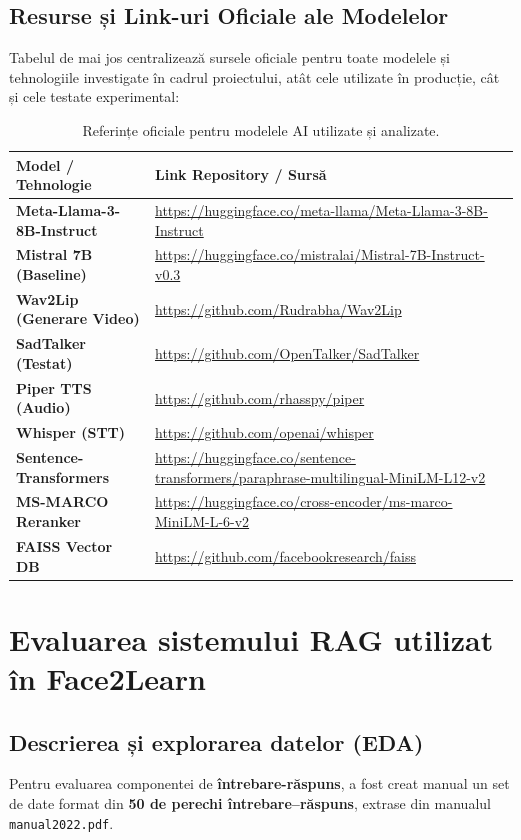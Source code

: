 \documentclass[12pt,a4paper]{report}
\begin{document}
\section{Resurse și Link-uri Oficiale ale Modelelor}
Tabelul de mai jos centralizează sursele oficiale pentru toate modelele și tehnologiile investigate în cadrul proiectului, atât cele utilizate în producție, cât și cele testate experimental:

\begin{table}[h!]
\centering
\begin{tabular}{|p{5cm}|p{9cm}|}
\hline
\textbf{Model / Tehnologie} & \textbf{Link Repository / Sursă} \\
\hline
\textbf{Meta-Llama-3-8B-Instruct} & \url{https://huggingface.co/meta-llama/Meta-Llama-3-8B-Instruct} \\
\hline
\textbf{Mistral 7B (Baseline)} & \url{https://huggingface.co/mistralai/Mistral-7B-Instruct-v0.3} \\
\hline
\textbf{Wav2Lip (Generare Video)} & \url{https://github.com/Rudrabha/Wav2Lip} \\
\hline
\textbf{SadTalker (Testat)} & \url{https://github.com/OpenTalker/SadTalker} \\
\hline
\textbf{Piper TTS (Audio)} & \url{https://github.com/rhasspy/piper} \\
\hline
\textbf{Whisper (STT)} & \url{https://github.com/openai/whisper} \\
\hline
\textbf{Sentence-Transformers} & \url{https://huggingface.co/sentence-transformers/paraphrase-multilingual-MiniLM-L12-v2} \\
\hline
\textbf{MS-MARCO Reranker} & \url{https://huggingface.co/cross-encoder/ms-marco-MiniLM-L-6-v2} \\
\hline
\textbf{FAISS Vector DB} & \url{https://github.com/facebookresearch/faiss} \\
\hline
\end{tabular}
\caption{Referințe oficiale pentru modelele AI utilizate și analizate.}
\end{table}

\chapter{Evaluarea sistemului RAG utilizat în Face2Learn}

\section{Descrierea și explorarea datelor (EDA)}
Pentru evaluarea componentei de \textbf{întrebare-răspuns}, a fost creat manual un set de date format din \textbf{50 de perechi întrebare–răspuns}, extrase din manualul \texttt{manual2022.pdf}.
\end{document}
